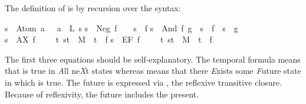 \begin{isabellebody}
\begin{isamarkuptext}
\smallskip
The definition of \isa{{\isasymTurnstile}} is by recursion over the syntax:%
\end{isamarkuptext}%
\isanewline
{\isachardoublequote}s\ {\isasymTurnstile}\ Atom\ a\ \ {\isacharequal}\ {\isacharparenleft}a\ {\isasymin}\ L\ s{\isacharparenright}{\isachardoublequote}\isanewline
{\isachardoublequote}s\ {\isasymTurnstile}\ Neg\ f\ \ \ {\isacharequal}\ {\isacharparenleft}{\isasymnot}{\isacharparenleft}s\ {\isasymTurnstile}\ f{\isacharparenright}{\isacharparenright}{\isachardoublequote}\isanewline
{\isachardoublequote}s\ {\isasymTurnstile}\ And\ f\ g\ {\isacharequal}\ {\isacharparenleft}s\ {\isasymTurnstile}\ f\ {\isasymand}\ s\ {\isasymTurnstile}\ g{\isacharparenright}{\isachardoublequote}\isanewline
{\isachardoublequote}s\ {\isasymTurnstile}\ AX\ f\ \ \ \ {\isacharequal}\ {\isacharparenleft}{\isasymforall}t{\isachardot}\ {\isacharparenleft}s{\isacharcomma}t{\isacharparenright}\ {\isasymin}\ M\ {\isasymlongrightarrow}\ t\ {\isasymTurnstile}\ f{\isacharparenright}{\isachardoublequote}\isanewline
{\isachardoublequote}s\ {\isasymTurnstile}\ EF\ f\ \ \ \ {\isacharequal}\ {\isacharparenleft}{\isasymexists}t{\isachardot}\ {\isacharparenleft}s{\isacharcomma}t{\isacharparenright}\ {\isasymin}\ M\isactrlsup {\isacharasterisk}\ {\isasymand}\ t\ {\isasymTurnstile}\ f{\isacharparenright}{\isachardoublequote}%
\begin{isamarkuptext}%
\noindent
The first three equations should be self-explanatory. The temporal formula
 means that  is true in \emph{A}ll ne\emph{X}t states whereas
 means that there \emph{E}xists some \emph{F}uture state in which  is
true. The future is expressed via \isa{\isactrlsup {\isacharasterisk}}, the reflexive transitive
closure. Because of reflexivity, the future includes the present.


\end{isamarkuptext}
\end{isabellebody}
